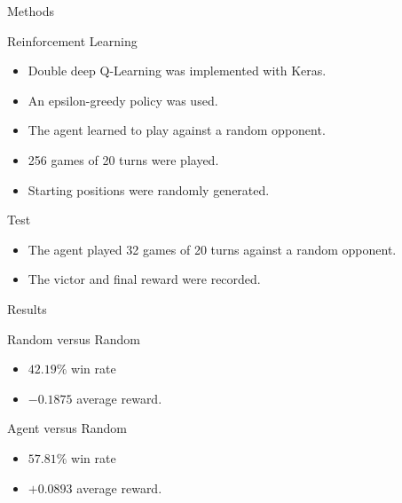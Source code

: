 \documentclass{beamer}
\begin{document}

\begin{frame}{Methods}

\begin{block}{Reinforcement Learning \cite{chollet2015keras} \cite{puterman2014markov} \cite{van2016deep}}
\begin{itemize}
\item Double deep Q-Learning was implemented with Keras.
\item An epsilon-greedy policy was used.
\item The agent learned to play against a random opponent.
\item 256 games of 20 turns were played.
\item Starting positions were randomly generated.
\end{itemize}
\end{block}

\begin{block}{Test}
\begin{itemize}
\item The agent played 32 games of 20 turns against a random opponent.
\item The victor and final reward were recorded.
\end{itemize}
\end{block}

\end{frame}


\begin{frame}{Results}

\begin{block}{Random versus Random}
\begin{itemize}
\item $42.19\%$ win rate
\item $-0.1875$ average reward.
\end{itemize}
\end{block}

\begin{block}{Agent versus Random}
\begin{itemize}
\item $57.81\%$ win rate
\item $+0.0893$ average reward.
\end{itemize}
\end{block}

\end{frame}

\end{document}
